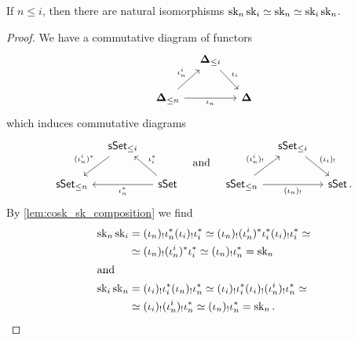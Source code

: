 \begin{lemma}\label{lem:sk-comp}
  If \(n\leq i\), then there are natural isomorphisms \(\operatorname{\textnormal{sk}}_n\operatorname{\textnormal{sk}}_i\simeq \operatorname{\textnormal{sk}}_n
  \simeq \operatorname{\textnormal{sk}}_i\operatorname{\textnormal{sk}}_n\).
\end{lemma}
\begin{proof}
  We have a commutative diagram of functors
  \[
    \begin{tikzcd}[column sep=1em]
      {} & \simplex_{\leq i} \arrow[rd, "\iota_i"] & {} \\
      \simplex_{\leq n} \arrow[ru, "\iota_n^i"] \arrow[rr, "\iota_n"'] & &
      \simplex
    \end{tikzcd}
  \]
  which induces commutative diagrams
  \[
    \begin{tikzcd}[column sep=1em]
      {} & \sset_{\leq i} \arrow[dl, "(\iota_n^i)^{*}"'] & {} \\
      \sset_{\leq n} & & \sset \arrow[ul, "\iota_i^{*}"'] \arrow[ll,
      "\iota_n^{*}"]
    \end{tikzcd}\quad\text{and}\quad
    \begin{tikzcd}[column sep=1em]
      {} & \sset_{\leq i} \arrow[dr, "(\iota_i)_{!}"] & {} \\
      \sset_{\leq n} \arrow[ru, "(\iota_n^i)_{!}"] \arrow[rr, "(\iota_n)_{!}"']
      & & \sset.
    \end{tikzcd}
  \]
  By \autoref{lem:cosk_sk_composition} we find
  \begin{align*}
    \operatorname{\textnormal{sk}}_n\operatorname{\textnormal{sk}}_i &= (\iota_n)_{!}\iota_n^{*}(\iota_i)_{!}\iota_i^{*} \simeq
                 (\iota_n)_{!}(\iota_n^i)^{*}\iota_i^{*}(\iota_i)_{!}\iota_i^{*} \simeq
    \\
               &\simeq (\iota_n)_{!}(\iota_{n}^i)^{*}\iota_i^{*}\simeq
                 (\iota_n)_{!}\iota_n^{*} = \operatorname{\textnormal{sk}}_{n} \\
    \shortintertext{and}
    \operatorname{\textnormal{sk}}_i\operatorname{\textnormal{sk}}_n &= (\iota_i)_{!}\iota_i^{*}(\iota_n)_{!}\iota_n^{*}
                 \simeq
                 (\iota_i)_{!}\iota_i^{*}(\iota_i)_{!}(\iota_n^i)_{!}\iota_n^{*}
                 \simeq \\
               &\simeq (\iota_i)_{!}(\iota_n^i)_{!}\iota_n^{*} \simeq
                 (\iota_n)_{!}\iota_n^{*} = \operatorname{\textnormal{sk}}_n.\qedhere
  \end{align*}
\end{proof}

